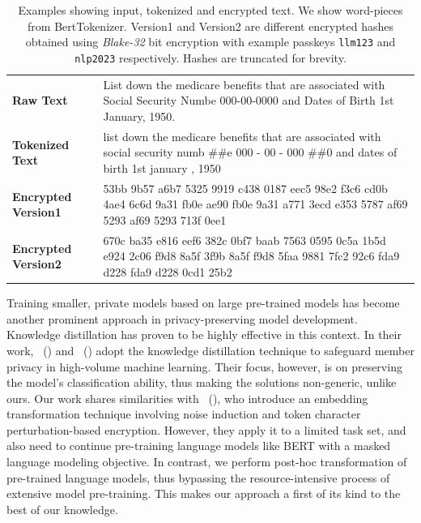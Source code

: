 \documentclass[letterpaper]{article} %
\begin{document}
\begin{table}[t]
    \centering
    \footnotesize
    \begin{tabular}{p{3.5cm} p{12.5cm}}
        \toprule
        \midrule
        \textbf{Raw Text} & List down the medicare benefits that are associated with Social Security Numbe 000-00-0000 and Dates of Birth 1st January, 1950. \\
        \textbf{Tokenized Text} & list down the medicare benefits that are associated with social security numb \#\#e 000 - 00 - 000 \#\#0 and dates of birth 1st january , 1950 \\
        \textbf{Encrypted Version1} & 53bb 9b57 a6b7 5325 9919 c438 0187 eec5 98e2 f3c6 cd0b 4ae4 6c6d 9a31 fb0e ae90 fb0e 9a31 a771 3ecd e353 5787 af69 5293 af69 5293 713f 0ee1 \\
        \textbf{Encrypted Version2} & 670c ba35 e816 eef6 382c 0bf7 baab 7563 0595 0c5a 1b5d e924 2c06 f9d8 8a5f 3f9b 8a5f f9d8 5faa 9881 7fc2 92c6 fda9 d228 fda9 d228 0cd1 25b2 \\
        \bottomrule
    \end{tabular}
    \caption{Examples showing input, tokenized and encrypted text. We show word-pieces from BertTokenizer. Version1 and Version2 are different encrypted hashes obtained using \textit{Blake-32} bit encryption with example passkeys \texttt{llm123} and \texttt{nlp2023} respectively. Hashes are truncated for brevity.}
    \label{tab:example_blake_table}
\end{table}
Training smaller, private models based on large pre-trained models has become another prominent approach in privacy-preserving model development. Knowledge distillation has proven to be highly effective in this context. In their work, \citeauthor{wang2019private}~(\citeyear{wang2019private}) and \citeauthor{shejwalkar2021membership}~(\citeyear{shejwalkar2021membership}) adopt the knowledge distillation technique to safeguard member privacy in high-volume machine learning. Their focus, however, is on preserving the model's classification ability, thus making the solutions non-generic, unlike ours. Our work shares similarities with \citeauthor{qu2021natural}~(\citeyear{qu2021natural}), who introduce an embedding transformation technique involving noise induction and token character perturbation-based encryption. However, they apply it to a limited task set, and also need to continue pre-training  language models like BERT with a masked language modeling objective. In contrast, we perform post-hoc transformation of pre-trained language models, thus bypassing the resource-intensive process of extensive model pre-training. This makes our approach a first of its kind to the best of our knowledge.
\end{document}
